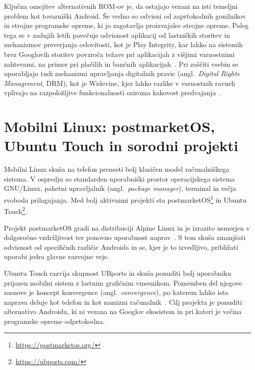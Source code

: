 \documentclass[a4paper,12pt,openright]{book}
\begin{document}
Ključna omejitev alternativnih ROM-ov je, da ostajajo vezani na isti temeljni problem kot tovarniški Android.
Še vedno so odvisni od zaprtokodnih gonilnikov in strojne programske opreme, ki jo zagotavlja proizvajalec strojne opreme.
Poleg tega se v zadnjih letih povečuje odvisnost aplikacij od lastniških storitev in mehanizmov preverjanja celovitosti, kot je Play Integrity, kar lahko na sistemih brez Googlovih storitev povzroča težave pri aplikacijah z višjimi varnostnimi zahtevami, na primer pri plačilih in bančnih aplikacijah~\cite{play_integrity_overview,google_play_integrity_help}.
Pri zaščiti vsebin se uporabljajo tudi mehanizmi upravljanja digitalnih pravic (angl.~\textit{Digital Rights Management}, DRM), kot je Widevine, kjer lahko razlike v varnostnih ravneh vplivajo na razpoložljive funkcionalnosti oziroma kakovost predvajanja~\cite{widevine_overview_2024,widevine_help_security_levels,chrome_media_updates_chrome62_2017,bitmovin_widevine_levels}.

\section{Mobilni Linux: postmarketOS, Ubuntu Touch in sorodni projekti}
\label{sec:mobile_linux}

Mobilni Linux skuša na telefon prenesti bolj klasičen model računalniškega sistema.
V ospredju so standarden uporabniški prostor operacijskega sistema GNU/Linux, paketni upravljalnik (angl.~\textit{package manager}), terminal in večja svoboda prilagajanja.
Med bolj aktivnimi projekti sta postmarketOS\footnote{\url{https://postmarketos.org/}} in Ubuntu Touch\footnote{\url{https://ubports.com/}}.

Projekt postmarketOS gradi na distribuciji Alpine Linux in je izrazito usmerjen v dolgoročno vzdržljivost ter ponovno uporabnost naprav~\cite{postmarketos_about}.
S tem skuša zmanjšati odvisnost od specifičnih različic Androida in se, kjer je to izvedljivo, približati uporabi jedra glavne razvojne veje.

Ubuntu Touch razvija skupnost UBports in skuša ponuditi bolj uporabniku prijazen mobilni sistem z lastnim grafičnim vmesnikom.
Pomemben del njegove zasnove je koncept konvergence (angl.~\textit{convergence}), po katerem lahko ista naprava deluje kot telefon in kot namizni računalnik~\cite{ubports_ubuntu_touch,ubports_convergence}.
Cilj projekta je ponuditi alternativo Androidu, ki ni vezana na Googlov ekosistem in pri kateri je večina programske opreme odprtokodna.
\end{document}
